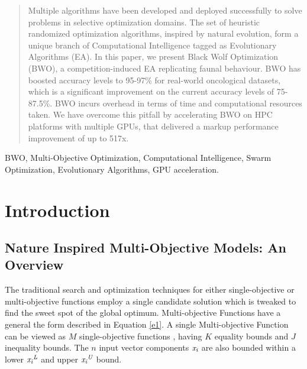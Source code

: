 \documentclass[conference]{IEEEtran}
\theoremstyle{definition}
\begin{document}
\begin{abstract}
Multiple algorithms have been developed and deployed successfully to solve problems in selective optimization domains. The set of heuristic randomized optimization algorithms, inspired by natural evolution, form a unique branch of Computational Intelligence tagged as Evolutionary Algorithms (EA). In this paper, we present Black Wolf Optimization (BWO), a competition-induced EA replicating faunal behaviour. BWO has boosted accuracy levels to 95-97\% for real-world oncological datasets, which is a significant improvement on the current accuracy levels of 75-87.5\%. BWO incurs overhead in terms of time and computational resources taken. We have overcome this pitfall by accelerating BWO on HPC platforms with multiple GPUs,  that delivered a markup performance improvement of up to 517x.
\end{abstract}

\begin{IEEEkeywords}
BWO, Multi-Objective Optimization, Computational Intelligence, Swarm Optimization, Evolutionary Algorithms, GPU acceleration.
\end{IEEEkeywords}

\section{Introduction}

\subsection{Nature Inspired Multi-Objective Models: An Overview}

The traditional search and optimization techniques for either single-objective or multi-objective functions employ a single candidate solution which is tweaked to find the sweet spot of the global optimum. Multi-objective Functions have a general the form described in Equation \ref{e1}. A single Multi-objective Function can be viewed as $\textit{M}$ single-objective functions \cite{chankong}, having $\textit{K}$ equality bounds and $\textit{J}$ inequality bounds. The $\textit{n}$ input vector components $\textit{x\textsubscript{i}}$ are also bounded within a lower $\textit{x\textsubscript{i}\textsuperscript{L}}$ and upper $\textit{x\textsubscript{i}\textsuperscript{U}}$ bound. 
\end{document}
